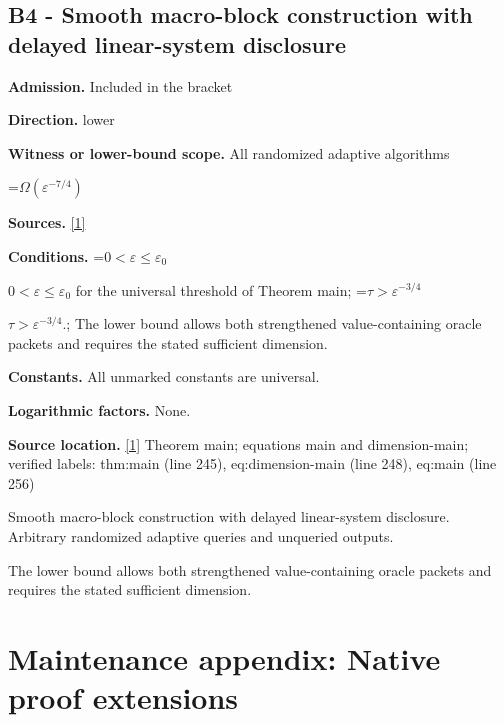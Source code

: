\documentclass[10pt,a4paper]{article}
\newcommand{\AtlasMath}[1]{\par\begingroup\centering\setbox0=\hbox{$\displaystyle #1$}\ifdim\wd0>1.4\linewidth\typeout{ATLAS WIDE FORMULA: \the\wd0}\fi\ifdim\wd0>\linewidth\resizebox{\linewidth}{!}{\box0}\else\box0\fi\par\endgroup}
\newcommand{\AtlasInlineMath}[1]{\begingroup\setbox0=\hbox{$#1$}\ifdim\wd0>.4\linewidth\endgroup\AtlasMath{#1}\else\endgroup$#1$\fi}
\begin{document}
\subsection{B4 - Smooth macro-block construction with delayed linear-system disclosure}


\textbf{Admission.} Included in the bracket



\textbf{Direction.} lower



\textbf{Witness or lower-bound scope.} All randomized adaptive algorithms



\AtlasMath{\Omega(\varepsilon^{-7/4})}


\textbf{Sources.} \href{https://github.com/WU-Wendao/Colombo/blob/main/colombo_sensorium/Complexity_altas/data/sources/colombo/A4/manuscript.pdf}{[1]}



\textbf{Conditions.} \AtlasInlineMath{0<\varepsilon\le\varepsilon_0} for the universal threshold of Theorem main; \AtlasInlineMath{\tau>\varepsilon^{-3/4}}.; The lower bound allows both strengthened value-containing oracle packets and requires the stated sufficient dimension.



\textbf{Constants.} All unmarked constants are universal.



\textbf{Logarithmic factors.} None.



\textbf{Source location.} \href{https://github.com/WU-Wendao/Colombo/blob/main/colombo_sensorium/Complexity_altas/data/sources/colombo/A4/manuscript.pdf}{[1]} Theorem main; equations main and dimension-main; verified labels: thm:main (line 245), eq:dimension-main (line 248), eq:main (line 256)



Smooth macro-block construction with delayed linear-system disclosure. Arbitrary randomized adaptive queries and unqueried outputs.



The lower bound allows both strengthened value-containing oracle packets and requires the stated sufficient dimension.



\section{Maintenance appendix: Native proof extensions}
\end{document}
